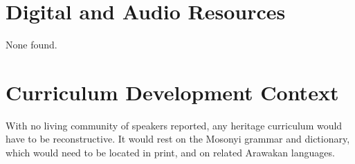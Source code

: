 \documentclass[12pt]{article}
\begin{document}
\section{Digital and Audio Resources}
None found.

\section{Curriculum Development Context}
With no living community of speakers reported, any heritage curriculum would have to be reconstructive. It would rest on the Mosonyi grammar and dictionary, which would need to be located in print, and on related Arawakan languages.
\end{document}
